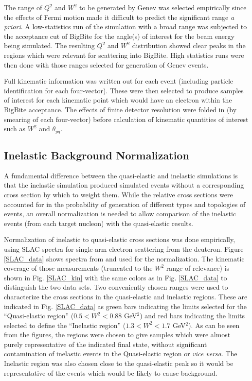 \documentclass[12pt,letterpaper,oneside]{article}
\begin{document}
The range of $Q^2$ and $W^2$ to be generated by Genev was selected
empirically since the effects of Fermi motion made it difficult to
predict the significant range {\it a priori}.  A low-statistics run of
the simulation with a broad range was subjected to the acceptance cut
of BigBite for the angle(s) of interest for the beam energy being
simulated.  The resulting $Q^2$ and $W^2$ distribution showed clear
peaks in the regions which were relevant for scattering into BigBite.
High statistics runs were then done with those ranges selected for generation
of Genev events.

Full kinematic information was written out for each event (including
particle identification for each four-vector).  These were then
selected to produce samples of interest for each kinematic point which
would have an electron within the BigBite acceptance.  The effects of
finite detector resolution were folded in (by smearing of
each four-vector) before calculation of kinematic quantities of
interest such as $W^2$ and $\theta_{pq}$. 




\subsection{Inelastic Background Normalization}

A fundamental difference between the quasi-elastic and inelastic
simulations is that the inelastic simulation produced simulated events
without a corresponding cross section by which to weight them.  While
the relative cross sections were accounted for in the probability of
generation of different types and topologies of events, an overall
normalization is needed to allow comparison of the inelastic events
(from each target nucleon) with the quasi-elastic results.  

Normalization of inelastic to quasi-elastic cross sections was done
empirically, using SLAC spectra for single-arm electron scattering
from the deuteron. Figure \ref{SLAC_data} shows spectra from
\cite{SLAC_Stuart} and \cite{SLAC_Rock} used for the normalization.
The kinematic coverage of those measurements (truncated to the $W^2$
range of relevance) is shown in Fig. \ref{SLAC_kin} with the same
colors as in Fig. \ref{SLAC_data} to distinguish the two data sets.
Two conveniently chosen ranges were used to characterize the cross
sections in the quasi-elastic and inelastic regions.  These are
indicated in Fig. \ref{SLAC_data}  as green bars indicating the limits selected
for the 
``Quasi-elastic region'' ($0.5<W^2<0.88$ GeV$^2$) and red bars
indicating the limits selected to define the ``Inelastic region''  ($1.3<W^2<1.7$ GeV$^2$).
As can be seen from the figures, the regions were chosen to give
samples which were almost purely representative of the indicated final
state, without significant contamination of inelastic events in the
Quasi-elastic region or {\it vice versa}.  The Inelastic region was
also chosen close to the quasi-elastic peak so it would be
representative of the events which would be likely to cause
background.
\end{document}
